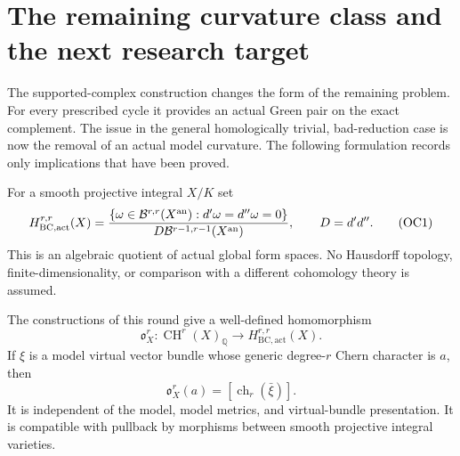 \section{The remaining curvature class and the next research target}
\label{r11o:section}

The supported-complex construction changes the form of the remaining
problem.  For every prescribed cycle it provides an actual Green pair
on the exact complement.  The issue in the general homologically
trivial, bad-reduction case is now the removal of an actual model
curvature.  The following formulation records only implications that
have been proved.

For a smooth projective integral $X/K$ set
\[
 H_{\mathrm{BC,act}}^{r,r}(X)=
 \frac{\{\omega\in\mathcal B^{r,r}(X^{\rm an}):
                  d'\omega=d''\omega=0\}}
      {D\mathcal B^{r-1,r-1}(X^{\rm an})},\qquad D=d'd''.
\tag{OC1}\label{r11o:BC}
\]
This is an algebraic quotient of actual global form spaces.  No
Hausdorff topology, finite-dimensionality, or comparison with a
different cohomology theory is assumed.

\begin{proposition}
\label{r11o:class}
The constructions of this round give a well-defined homomorphism
\[
  \mathfrak o_X^r:\operatorname{CH}^r(X)_{\mathbb Q}
                       \longrightarrow H_{\mathrm{BC,act}}^{r,r}(X).
\tag{OC2}\label{r11o:map}
\]
If $\xi$ is a model virtual vector bundle whose generic degree-$r$
Chern character is $a$, then
\[
                  \mathfrak o_X^r(a)=[\operatorname{ch}_r(\bar\xi)].
\]
It is independent of the model, model metrics, and virtual-bundle
presentation.  It is compatible with pullback by morphisms between
smooth projective integral varieties.
\end{proposition}

